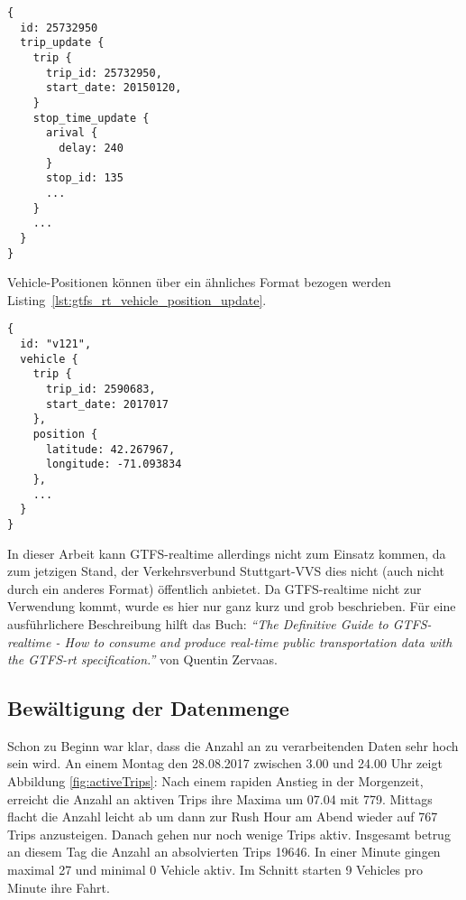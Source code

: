 \begin{newpage}
        \begin{lstlisting}[captionpos=b, caption={Auszug eines GTFS-realtime Trip Updates von MBTA},label={lst:gtfs_rt_trip_update}]
{
  id: 25732950
  trip_update {
    trip {
      trip_id: 25732950,
      start_date: 20150120,
    }
    stop_time_update {
      arival {
        delay: 240
      }
      stop_id: 135
      ...
    }
    ...
  }
}
      \end{lstlisting}

      Vehicle-Positionen können über ein ähnliches Format bezogen werden Listing~\ref{lst:gtfs_rt_vehicle_position_update}.

      \begin{lstlisting}[captionpos={b},caption={Auszug eines GTFS-realtime Vehicle-Position Updates von MBTA},label={lst:gtfs_rt_vehicle_position_update}]
{
  id: "v121",
  vehicle {
    trip {
      trip_id: 2590683,
      start_date: 2017017
    },
    position {
      latitude: 42.267967,
      longitude: -71.093834
    },
    ...
  }
}
      \end{lstlisting}

      In dieser Arbeit kann GTFS-realtime allerdings nicht zum Einsatz kommen, da zum jetzigen Stand, der Verkehrsverbund Stuttgart-VVS dies nicht (auch nicht durch ein anderes Format) öffentlich anbietet. Da GTFS-realtime nicht zur Verwendung kommt, wurde es hier nur ganz kurz und grob beschrieben. Für eine ausführlichere Beschreibung hilft das Buch: \textit{"`The Definitive Guide to GTFS-realtime - How to consume and produce real-time public transportation data with the GTFS-rt specification."'}\parencite{zervaas_realtime} von Quentin Zervaas.\\


    \subsection{Bewältigung der Datenmenge}
    \label{sub:bewältigung_der_datenmenge}
      Schon zu Beginn war klar, dass die Anzahl an zu verarbeitenden Daten sehr hoch sein wird. An einem Montag den 28.08.2017 zwischen 3.00 und 24.00 Uhr zeigt Abbildung \ref{fig:activeTrips}: Nach einem rapiden Anstieg in der Morgenzeit, erreicht die Anzahl an aktiven Trips ihre Maxima um 07.04 mit 779. Mittags flacht die Anzahl leicht ab um dann zur Rush Hour am Abend wieder auf 767 Trips anzusteigen. Danach gehen nur noch wenige Trips aktiv. Insgesamt betrug an diesem Tag die Anzahl an absolvierten Trips 19646. In einer Minute gingen maximal 27 und minimal 0 Vehicle aktiv. Im Schnitt starten 9 Vehicles pro Minute ihre Fahrt. 


\end{newpage}
